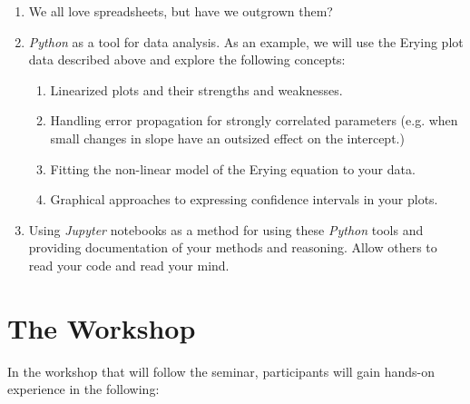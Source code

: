 \documentclass{tufte-handout}
\begin{document}
\begin{enumerate}

\item We all love spreadsheets, but have we outgrown them?

\item \textit{Python} as a tool for data analysis. As an example, we will use the Erying plot data described above and explore the following concepts:

\begin{enumerate}

\item Linearized plots and their strengths and weaknesses.
\item Handling error propagation for strongly correlated parameters (e.g. when small changes in slope have an outsized effect on the intercept.)
\item Fitting the non-linear model of the Erying equation to your data.
\item Graphical approaches to expressing confidence intervals in your plots.

\end{enumerate}

\item Using \textit{Jupyter} notebooks as a method for using these \textit{Python} tools and providing documentation of your methods and reasoning. Allow others to read your code and read your mind.

\end{enumerate}


\section{The Workshop}

In the workshop that will follow the seminar, participants will gain hands-on experience in the following:
\end{document}
